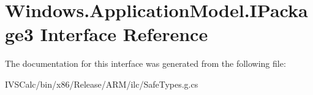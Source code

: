 \hypertarget{interface_windows_1_1_application_model_1_1_i_package3}{}\section{Windows.\+Application\+Model.\+I\+Package3 Interface Reference}
\label{interface_windows_1_1_application_model_1_1_i_package3}


The documentation for this interface was generated from the following file\+:\begin{DoxyCompactItemize}
\item 
I\+V\+S\+Calc/bin/x86/\+Release/\+A\+R\+M/ilc/Safe\+Types.\+g.\+cs\end{DoxyCompactItemize}
